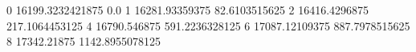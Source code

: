 0 16199.3232421875 0.0
1 16281.93359375 82.6103515625
2 16416.4296875 217.1064453125
4 16790.546875 591.2236328125
6 17087.12109375 887.7978515625
8 17342.21875 1142.8955078125
